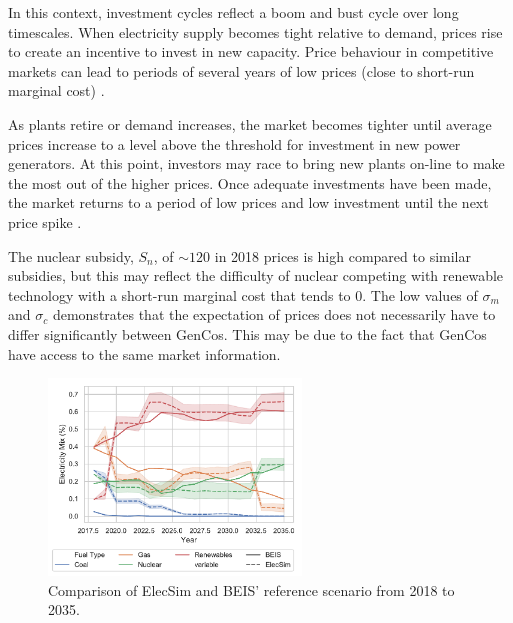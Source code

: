 In this context, investment cycles reflect a boom and bust cycle over long timescales. When electricity supply becomes tight relative to demand, prices rise to create an incentive to invest in new capacity. Price behaviour in competitive markets can lead to periods of several years of low prices (close to short-run marginal cost) \cite{white2005concentrated}. 

As plants retire or demand increases, the market becomes tighter until average prices increase to a level above the threshold for investment in new power generators. At this point, investors may race to bring new plants on-line to make the most out of the higher prices. Once adequate investments have been made, the market returns to a period of low prices and low investment until the next price spike \cite{Gross2007}. 


The nuclear subsidy, $S_n$, of ${\sim}$\textsterling $120$ in 2018 prices is high compared to similar subsidies, but this may reflect the difficulty of nuclear competing with renewable technology with a short-run marginal cost that tends to \textsterling $0$. The low values of $\sigma_m$ and $\sigma_c$ demonstrates that the expectation of prices does not necessarily have to differ significantly between GenCos. This may be due to the fact that GenCos have access to the same market information.


\begin{figure}
	\centering
	\includegraphics[width=0.60\textwidth]{Chapter4/figures/e-Energy-2020/results/scenario_analysis/best_forward_scenario_below_legend.pdf}
	\caption{Comparison of ElecSim and BEIS' reference scenario from 2018 to 2035.}
	\label{fig:forward_scenario_beis_elecsim}
\end{figure}




